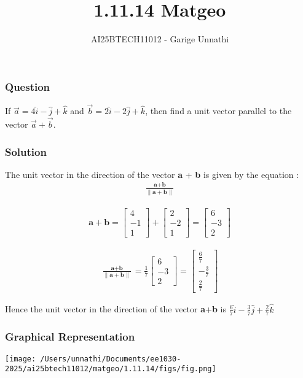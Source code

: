 \documentclass{beamer}
\title{1.11.14 Matgeo}
\author{AI25BTECH11012 - Garige Unnathi}
\date{}
\begin{document}
\frame{\titlepage}

\begin{frame}
\frametitle{Question}
If $\vec{a} = 4\hat{i} - \hat{j} + \hat{k}$ and $\vec{b} = 2\hat{i} - 2\hat{j} + \hat{k}$, 
then find a unit vector parallel to the vector $\vec{a} + \vec{b}$.
 \end{frame}




\begin{frame}
\frametitle{Solution}
The unit vector in the direction of the vector  \textbf{a} + \textbf{b} is given by the equation :
 \begin{align*}
\frac{\textbf{a}+\textbf{b}}{\lVert \textbf{a}+\textbf{b} \rVert}
\end{align*}


\begin{align}
     \textbf{a}+\textbf{b} = \begin{bmatrix}4 \\ -1 \\ 1\end{bmatrix} + \begin{bmatrix}2 \\ -2 \\ 1\end{bmatrix} = \begin{bmatrix}6 \\ -3 \\ 2\end{bmatrix}
\end{align}

\begin{align}
   \frac{\textbf{a}+\textbf{b}}{\lVert \textbf{a}+\textbf{b} \rVert} = \frac{1}{7} \begin{bmatrix}6 \\ -3 \\ 2\end{bmatrix} = \begin{bmatrix}\frac{6}{7} \\ -\frac{3}{7} \\ \frac{2}{7}\end{bmatrix}
\end{align}
 \end{frame}


\begin{frame}
Hence the unit vector in the direction of the vector \textbf{a}+\textbf{b} is  $\frac{6}{7}\hat{i} - \frac{3}{7}\hat{j} + \frac{2}{7}\hat{k}$ 

\frametitle{Graphical Representation}
\begin{center}
\texttt{[image: /Users/unnathi/Documents/ee1030-2025/ai25btech11012/matgeo/1.11.14/figs/fig.png]}
\end{center}
\end{frame}
\end{document}
